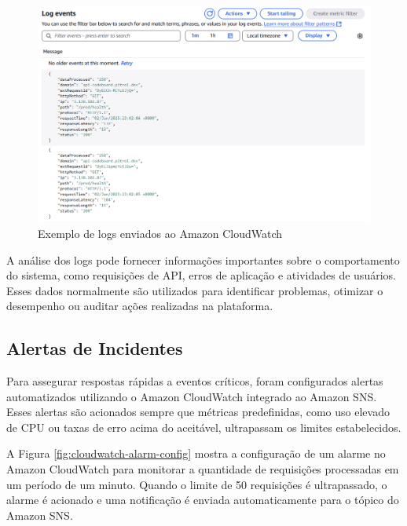 \begin{figure}[H]
    \centering
    \includegraphics[width=1\textwidth]{assets/monitoring-test/cloudwatch-logs.png}
    \caption{Exemplo de logs enviados ao Amazon CloudWatch}
    \label{fig:cloudwatch-logs}
\end{figure}

A análise dos logs pode fornecer informações importantes sobre o comportamento do sistema, como requisições de API, erros de aplicação e atividades de usuários. Esses dados normalmente são utilizados para identificar problemas, otimizar o desempenho ou auditar ações realizadas na plataforma.

\subsection{Alertas de Incidentes}

Para assegurar respostas rápidas a eventos críticos, foram configurados alertas automatizados utilizando o Amazon CloudWatch integrado ao Amazon SNS. Esses alertas são acionados sempre que métricas predefinidas, como uso elevado de CPU ou taxas de erro acima do aceitável, ultrapassam os limites estabelecidos.

A Figura \ref{fig:cloudwatch-alarm-config} mostra a configuração de um alarme no Amazon CloudWatch para monitorar a quantidade de requisições processadas em um período de um minuto. Quando o limite de 50 requisições é ultrapassado, o alarme é acionado e uma notificação é enviada automaticamente para o tópico do Amazon SNS.

